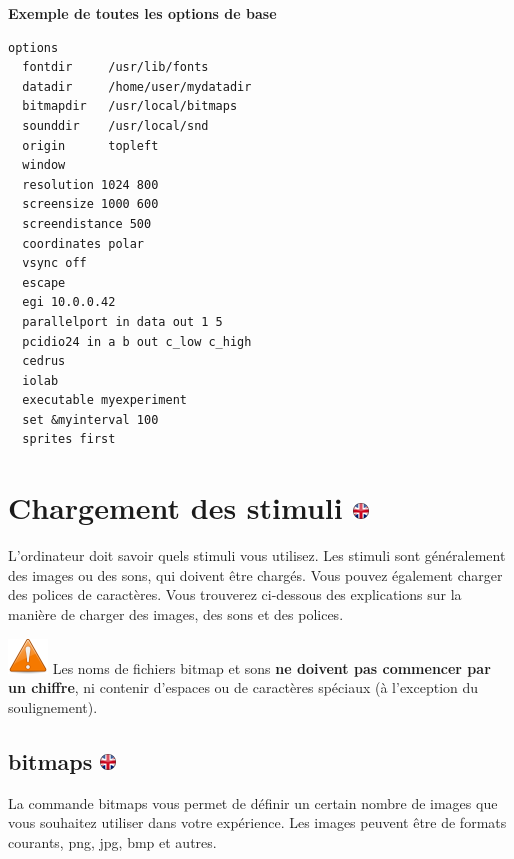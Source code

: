 \documentclass[
]{book}
\begin{document}
\textbf{Exemple de toutes les options de base}

\begin{verbatim}
options
  fontdir     /usr/lib/fonts
  datadir     /home/user/mydatadir
  bitmapdir   /usr/local/bitmaps
  sounddir    /usr/local/snd
  origin      topleft
  window
  resolution 1024 800
  screensize 1000 600
  screendistance 500
  coordinates polar
  vsync off
  escape
  egi 10.0.0.42
  parallelport in data out 1 5
  pcidio24 in a b out c_low c_high
  cedrus
  iolab
  executable myexperiment
  set &myinterval 100
  sprites first
\end{verbatim}

\hypertarget{chargement-des-stimuli}{%
\section[Chargement des stimuli ]{\texorpdfstring{Chargement des stimuli \href{https://www.psytoolkit.org/doc3.2.0/syntax.html\#loadingstimuli}{\protect\includegraphics{img/ukflag.png}}}{Chargement des stimuli }}\label{chargement-des-stimuli}}

L'ordinateur doit savoir quels stimuli vous utilisez. Les stimuli sont généralement des images ou des sons, qui doivent être chargés. Vous pouvez également charger des polices de caractères. Vous trouverez ci-dessous des explications sur la manière de charger des images, des sons et des polices.

\includegraphics{img/attention.png} Les noms de fichiers bitmap et sons \textbf{ne doivent pas commencer par un chiffre}, ni contenir d'espaces ou de caractères spéciaux (à l'exception du soulignement).

\hypertarget{bitmaps}{%
\subsection[bitmaps ]{\texorpdfstring{bitmaps \href{https://www.psytoolkit.org/doc3.2.0/syntax.html\#_bitmaps}{\protect\includegraphics{img/ukflag.png}}}{bitmaps }}\label{bitmaps}}

La commande bitmaps vous permet de définir un certain nombre de images que vous souhaitez utiliser dans votre expérience. Les images peuvent être de formats courants, png, jpg, bmp et autres.
\end{document}

